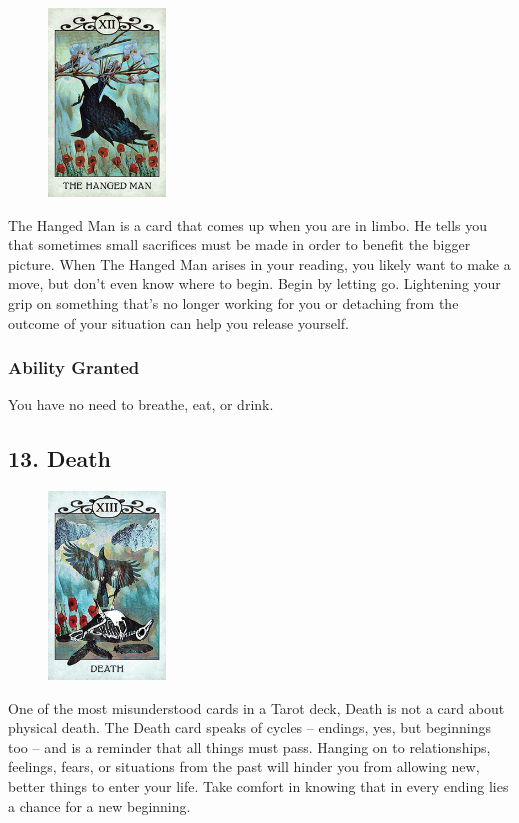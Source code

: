 \documentclass[10pt,twoside,twocolumn,openany,nodeprecatedcode]{dndbook}
\begin{document}
    \begin{figure}
        \includegraphics[height=5cm,width=\linewidth]{hangedman.jpg}
    \end{figure}
    The Hanged Man is a card that comes up when you are in limbo. He tells you that sometimes small sacrifices must be made in order to benefit the bigger picture. When The Hanged Man arises in your reading, you likely want to make a move, but don't even know where to begin. Begin by letting go. Lightening your grip on something that's no longer working for you or detaching from the outcome of your situation can help you release yourself. 

    \subsubsection*{Ability Granted}
    You have no need to breathe, eat, or drink.

    \subsection*{13. Death}

    \begin{figure}
        \includegraphics[height=5cm,width=\linewidth]{death.jpg}
    \end{figure}
    One of the most misunderstood cards in a Tarot deck, Death is not a card about physical death. The Death card speaks of cycles -- endings, yes, but beginnings too -- and is a reminder that all things must pass. Hanging on to relationships, feelings, fears, or situations from the past will hinder you from allowing new, better things to enter your life. Take comfort in knowing that in every ending lies a chance for a new beginning.
\end{document}
